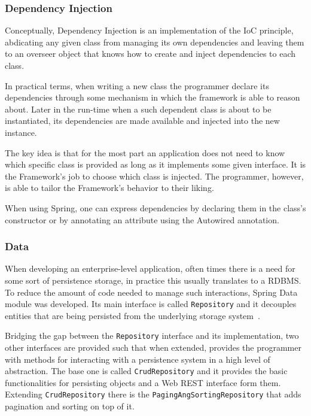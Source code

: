 \subsubsection{Dependency Injection}\label{spring:ds}
Conceptually, Dependency Injection is an implementation of the \gls{IoC} principle, abdicating any given class from managing its own dependencies and leaving them to an overseer object that knows how to create and inject dependencies to each class\cite{inversion}.

In practical terms, when writing a new class the programmer declare its dependencies through some mechanism in which the framework is able to reason about. Later in the run-time when a such dependent class is about to be instantiated, its dependencies are made available and injected into the new instance.

The key idea is that for the most part an application does not need to know which specific class is provided as long as it implements some given interface. It is the Framework's job to choose which class is injected. The programmer, however, is able to tailor the Framework's behavior to their liking.

When using Spring, one can express dependencies by declaring them in the class's constructor or by annotating an attribute using the Autowired annotation\cite{springdi}.

\subsubsection{Data}
When developing an enterprise-level application, often times there is a need for some sort of persistence storage, in practice this usually translates to a \gls{RDBMS}. To reduce the amount of code needed to manage such interactions, Spring Data module was developed. Its main interface is called \texttt{Repository} and it decouples entities that are being persisted from the underlying storage system~\cite{springdata}.

Bridging the gap between the \texttt{Repository} interface and its implementation, two other interfaces are provided such that when extended, provides the programmer with methods for interacting with a persistence system in a high level of abstraction. The base one is called \texttt{CrudRepository} and it provides the basic functionalities for persisting objects and a Web \gls{REST} interface form them. Extending \texttt{CrudRepository} there is the \texttt{PagingAngSortingRepository} that adds pagination and sorting on top of it.

